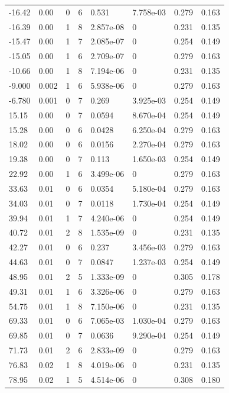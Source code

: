 \documentclass[preview]{standalone}
\begin{document}
{{\begin{tabular}{L{1.2cm}C{1.2cm} C{0.3cm}C{0.5cm} C{1.4cm}C{1.4cm} C{1.4cm}C{1.4cm}}
  -16.42  &  0.00  & 0     &  6 &  0.531  & 7.758e-03  & 0.279 &  0.163   \\ 
  -16.39  &  0.00  & 1     &  8 &  2.857e-08  & 0  & 0.231 &  0.135   \\ 
  -15.47  &  0.00  & 1     &  7 &  2.085e-07  & 0  & 0.254 &  0.149   \\ 
  -15.05  &  0.00  & 1     &  6 &  2.709e-07  & 0  & 0.279 &  0.163   \\ 
  -10.66  &  0.00  & 1     &  8 &  7.194e-06  & 0  & 0.231 &  0.135   \\ 
  -9.000  &  0.002  & 1     &  6 &  5.938e-06  & 0  & 0.279 &  0.163   \\ 
  -6.780  &  0.001  & 0     &  7 &  0.269  & 3.925e-03  & 0.254 &  0.149   \\ 
  15.15  &  0.00  & 0     &  7 &  0.0594  & 8.670e-04  & 0.254 &  0.149   \\ 
  15.28  &  0.00  & 0     &  6 &  0.0428  & 6.250e-04  & 0.279 &  0.163   \\ 
  18.02  &  0.00  & 0     &  6 &  0.0156  & 2.270e-04  & 0.279 &  0.163   \\ 
  19.38  &  0.00  & 0     &  7 &  0.113  & 1.650e-03  & 0.254 &  0.149   \\ 
  22.92  &  0.00  & 1     &  6 &  3.499e-06  & 0  & 0.279 &  0.163   \\ 
  33.63  &  0.01  & 0     &  6 &  0.0354  & 5.180e-04  & 0.279 &  0.163   \\ 
  34.03  &  0.01  & 0     &  7 &  0.0118  & 1.730e-04  & 0.254 &  0.149   \\ 
  39.94  &  0.01  & 1     &  7 &  4.240e-06  & 0  & 0.254 &  0.149   \\ 
  40.72  &  0.01  & 2     &  8 &  1.535e-09  & 0  & 0.231 &  0.135   \\ 
  42.27  &  0.01  & 0     &  6 &  0.237  & 3.456e-03  & 0.279 &  0.163   \\ 
  44.63  &  0.01  & 0     &  7 &  0.0847  & 1.237e-03  & 0.254 &  0.149   \\ 
  48.95  &  0.01  & 2     &  5 &  1.333e-09  & 0  & 0.305 &  0.178   \\ 
  49.31  &  0.01  & 1     &  6 &  3.326e-06  & 0  & 0.279 &  0.163   \\ 
  54.75  &  0.01  & 1     &  8 &  7.150e-06  & 0  & 0.231 &  0.135   \\ 
  69.33  &  0.01  & 0     &  6 &  7.065e-03  & 1.030e-04  & 0.279 &  0.163   \\ 
  69.85  &  0.01  & 0     &  7 &  0.0636  & 9.290e-04  & 0.254 &  0.149   \\ 
  71.73  &  0.01  & 2     &  6 &  2.833e-09  & 0  & 0.279 &  0.163   \\ 
  76.83  &  0.02  & 1     &  8 &  4.019e-06  & 0  & 0.231 &  0.135   \\ 
  78.95  &  0.02  & 1     &  5 &  4.514e-06  & 0  & 0.308 &  0.180   \\ 
\hline 
\end{tabular} 

}}
\end{document}
